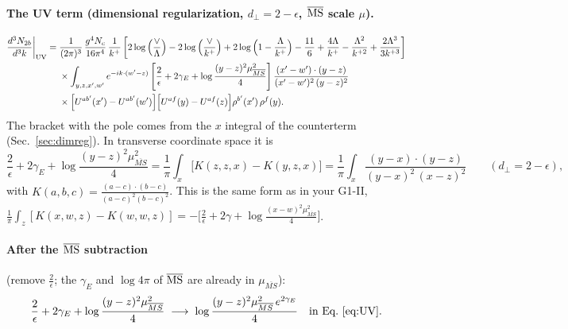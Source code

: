 \documentclass[10pt]{article}
\numberwithin{equation}{section}
\begin{document}
\paragraph{The UV term (dimensional regularization, $d_\perp=2-\epsilon$, $\overline{\rm MS}$ scale $\mu$).}
\begin{align}
\frac{d^{3}N_{2b}}{d^{3}k}\bigg|_{\rm UV}={}&\frac{1}{(2\pi)^{3}}\,\frac{g^{4}N_{c}}{16\pi^{4}}\,\frac{1}{k^{+}}
\left[2\log\Big(\frac{\vee}{\Lambda}\Big)-2\log\Big(\frac{\vee}{k^{+}}\Big)+2\log\Big(1-\frac{\Lambda}{k^{+}}\Big)-\frac{11}{6}+\frac{4\Lambda}{k^{+}}-\frac{\Lambda^{2}}{k^{+2}}+\frac{2\Lambda^{3}}{3k^{+3}}\right]\notag\\
&\times\int_{y,z,x',w'}e^{-ik\cdot(w'-z)}\left[\frac{2}{\epsilon}+2\gamma_{E}+\log\frac{(y-z)^{2}\mu^{2}_{\overline{MS}}}{4}\right]
\frac{(x'-w')\cdot(y-z)}{(x'-w')^{2}\,(y-z)^{2}}\notag\\
&\times\Big[U^{ab'}(x')-U^{ab'}(w')\Big]\Big[U^{af}(y)-U^{af}(z)\Big]\rho^{b'}(x')\,\rho^{f}(y).
\label{eq:UV}
\end{align}
The bracket with the pole comes from the $x$ integral of the counterterm (Sec.~\ref{sec:dimreg}). In transverse coordinate space it is
\begin{equation}
\frac{2}{\epsilon}+2\gamma_{E}+\log\frac{(y-z)^{2}\mu^{2}_{\overline{MS}}}{4}
=\frac{1}{\pi}\int_{x}\Big[K(z,z,x)-K(y,z,x)\Big]
=\frac{1}{\pi}\int_{x}\frac{(y-x)\cdot(y-z)}{(y-x)^{2}\,(x-z)^{2}}\qquad(d_\perp=2-\epsilon),
\label{eq:coord}
\end{equation}
with $K(a,b,c)=\frac{(a-c)\cdot(b-c)}{(a-c)^2(b-c)^2}$. This is the same form as in your G1-II, $\frac{1}{\pi}\int_z[K(x,w,z)-K(w,w,z)]=-\big[\frac2\epsilon+2\gamma+\log\frac{(x-w)^2\mu^2_{\overline{MS}}}{4}\big]$.

\paragraph{After the $\overline{\rm MS}$ subtraction} (remove $\frac2\epsilon$; the $\gamma_E$ and $\log4\pi$ of $\overline{\rm MS}$ are already in $\mu_{\overline{MS}}$):
\begin{equation}
\frac{2}{\epsilon}+2\gamma_{E}+\log\frac{(y-z)^{2}\mu^{2}_{\overline{MS}}}{4}\;\longrightarrow\;\log\frac{(y-z)^{2}\mu^{2}_{\overline{MS}}\,e^{2\gamma_E}}{4}
\quad\text{in Eq.~\eqref{eq:UV}.}
\label{eq:msbar}
\end{equation}
\end{document}
